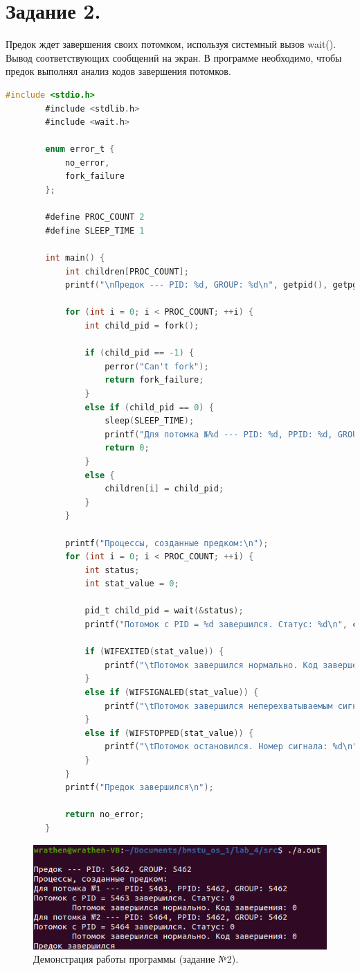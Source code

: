 \documentclass[12pt]{report}
\begin{document}
	\section*{Задание 2.}
	Предок ждет завершения своих потомком, используя системный вызов wait().
	Вывод соответствующих сообщений на экран.
	В программе необходимо, чтобы предок выполнял анализ кодов завершения потомков.
	
	\begin{lstlisting}[label=code:wait, caption=wait(), language=C]
		#include <stdio.h>
		#include <stdlib.h>
		#include <wait.h>
		
		enum error_t {
			no_error,
			fork_failure
		};
		
		#define PROC_COUNT 2
		#define SLEEP_TIME 1
		
		int main() {
			int children[PROC_COUNT];
			printf("\nПредок --- PID: %d, GROUP: %d\n", getpid(), getpgrp());
			
			for (int i = 0; i < PROC_COUNT; ++i) {
				int child_pid = fork();
				
				if (child_pid == -1) {
					perror("Can't fork");
					return fork_failure;
				}
				else if (child_pid == 0) {
					sleep(SLEEP_TIME);
					printf("Для потомка №%d --- PID: %d, PPID: %d, GROUP: %d\n", i + 1, getpid(), getppid(), getpgrp());
					return 0;
				}
				else {
					children[i] = child_pid;
				}
			}
			
			printf("Процессы, созданные предком:\n");
			for (int i = 0; i < PROC_COUNT; ++i) {
				int status;
				int stat_value = 0;
				
				pid_t child_pid = wait(&status);
				printf("Потомок с PID = %d завершился. Статус: %d\n", children[i], status);
				
				if (WIFEXITED(stat_value)) {
					printf("\tПотомок завершился нормально. Код завершения: %d\n", WEXITSTATUS(stat_value));
				}
				else if (WIFSIGNALED(stat_value)) {
					printf("\tПотомок завершился неперехватываемым сигналом. Номер сигнала: %d\n", WTERMSIG(stat_value));
				}
				else if (WIFSTOPPED(stat_value)) {
					printf("\tПотомок остановился. Номер сигнала: %d\n", WSTOPSIG(stat_value));
				}
			}
			printf("Предок завершился\n");
			
			return no_error;
		}
	\end{lstlisting}

	\begin{figure}[H]
	
		\centering
		
		\includegraphics[width=\linewidth]{img/task_02.png}
		\caption{Демонстрация работы программы (задание №2).}
		
		\label{fig:task_02}
	
	\end{figure}
\end{document}
